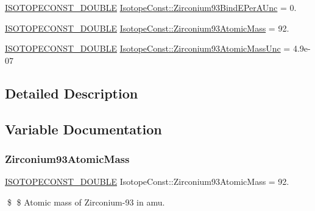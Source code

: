 \begin{DoxyCompactItemize}
\mbox{\hyperlink{group___isotope_const-_macros_ga8f45a7272ce02c0b4c65c44636ed719a}{I\+S\+O\+T\+O\+P\+E\+C\+O\+N\+S\+T\+\_\+\+D\+O\+U\+B\+LE}} \mbox{\hyperlink{group___isotope_const-_zirconium-_zr93_gaa3a2aaccef71b7e71e2211f1ce66abc3}{Isotope\+Const\+::\+Zirconium93\+Bind\+E\+Per\+A\+Unc}} = 0.
\item 
\mbox{\hyperlink{group___isotope_const-_macros_ga8f45a7272ce02c0b4c65c44636ed719a}{I\+S\+O\+T\+O\+P\+E\+C\+O\+N\+S\+T\+\_\+\+D\+O\+U\+B\+LE}} \mbox{\hyperlink{group___isotope_const-_zirconium-_zr93_gaf067cfd73a71a1267759d417db8d8b11}{Isotope\+Const\+::\+Zirconium93\+Atomic\+Mass}} = 92.
\item 
\mbox{\hyperlink{group___isotope_const-_macros_ga8f45a7272ce02c0b4c65c44636ed719a}{I\+S\+O\+T\+O\+P\+E\+C\+O\+N\+S\+T\+\_\+\+D\+O\+U\+B\+LE}} \mbox{\hyperlink{group___isotope_const-_zirconium-_zr93_ga7ddfdd04844fe28e19d03abdda090c1e}{Isotope\+Const\+::\+Zirconium93\+Atomic\+Mass\+Unc}} = 4.\+9e-\/07
\end{DoxyCompactItemize}


\subsection{Detailed Description}


\subsection{Variable Documentation}
\mbox{\label{group___isotope_const-_zirconium-_zr93_gaf067cfd73a71a1267759d417db8d8b11}} 
\subsubsection{\texorpdfstring{Zirconium93\+Atomic\+Mass}{Zirconium93AtomicMass}}
{\footnotesize\ttfamily \mbox{\hyperlink{group___isotope_const-_macros_ga8f45a7272ce02c0b4c65c44636ed719a}{I\+S\+O\+T\+O\+P\+E\+C\+O\+N\+S\+T\+\_\+\+D\+O\+U\+B\+LE}} Isotope\+Const\+::\+Zirconium93\+Atomic\+Mass = 92.}

\$ \$ Atomic mass of Zirconium-\/93 in amu. \mbox{\label{group___isotope_const-_zirconium-_zr93_ga7ddfdd04844fe28e19d03abdda090c1e}} 
